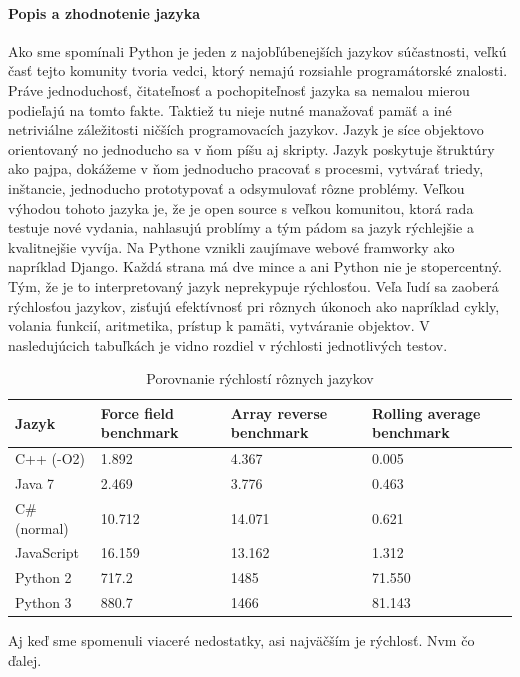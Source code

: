 \paragraph{Popis a zhodnotenie jazyka}
\indent Ako sme spomínali Python je jeden z najobľúbenejších jazykov súčastnosti, veľkú časť tejto komunity tvoria vedci, ktorý nemajú rozsiahle programátorské znalosti. Práve jednoduchosť, čitateľnosť a pochopiteľnosť jazyka sa nemalou mierou podieľajú na tomto fakte. Taktiež tu nieje nutné manažovať pamäť a iné netriviálne záležitosti ničších programovacích jazykov. Jazyk je síce objektovo orientovaný no jednoducho sa v ňom píšu aj skripty.  Jazyk poskytuje štruktúry ako pajpa, dokážeme v ňom jednoducho pracovať s procesmi, vytvárať triedy, inštancie, jednoducho prototypovať a odsymulovať rôzne problémy. Veľkou výhodou tohoto jazyka je, že je open source s veľkou komunitou, ktorá rada testuje nové vydania, nahlasujú problímy a tým pádom sa jazyk rýchlejšie a kvalitnejšie vyvíja. Na Pythone vznikli zaujímave webové framworky ako napríklad Django. Každá strana má dve mince a ani Python nie je stopercentný. Tým, že je to interpretovaný jazyk neprekypuje rýchlosťou. Veľa ľudí sa zaoberá rýchlosťou jazykov, zisťujú efektívnosť pri rôznych úkonoch ako napríklad cykly, volania funkcií, aritmetika, prístup k pamäti, vytváranie objektov. V nasledujúcich tabuľkách je vidno rozdiel v rýchlosti jednotlivých testov. 
\begin{center}
	\begin{table}[htbp]
		\begin{tabular}{|p{2.5cm}|p{2.5cm}|p{2.5cm}|p{2.5cm}|}
			\hline
			\textbf{Jazyk} & \textbf{Force field benchmark}  & \textbf{Array reverse benchmark}&\textbf{Rolling average benchmark} \\ 
			\hline
			C++ (-O2)&1.892&4.367&0.005\\
			\hline
			Java 7&2.469&3.776&0.463\\
			\hline
			C\# (normal)&10.712&14.071&0.621\\
			\hline
			JavaScript&16.159&13.162&1.312\\
			\hline
			Python 2&717.2&1485&71.550\\
			\hline
			Python 3&880.7&1466&81.143\\
			\hline
		\end{tabular}
		\caption{Porovnanie rýchlostí rôznych jazykov\cite{gitspeed}}
		\label{table:1}
	\end{table}
\end{center}
Aj keď sme spomenuli viaceré nedostatky, asi najväčším je rýchlosť. Nvm čo ďalej. 
